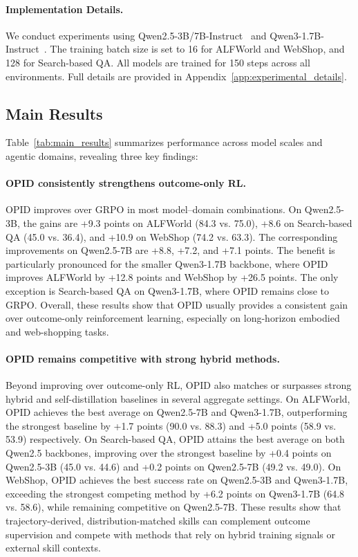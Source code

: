 \documentclass{llmxive}
\begin{document}
\paragraph{Implementation Details.}
We conduct experiments using Qwen2.5-3B/7B-Instruct~\citep{yang2024qwen25} and Qwen3-1.7B-Instruct~\citep{yang2025qwen3}. The training batch size is set to 16 for ALFWorld and WebShop, and 128 for Search-based QA. All models are trained for 150 steps across all environments. Full details are provided in Appendix~\ref{app:experimental_details}.


\subsection{Main Results}\label{subsec32_main_results}
Table~\ref{tab:main_results} summarizes performance across model scales and agentic domains, revealing three key findings:

\paragraph{OPID consistently strengthens outcome-only RL.}
OPID improves over GRPO in most model--domain combinations. On Qwen2.5-3B, the gains are +9.3 points on ALFWorld (84.3 vs. 75.0), +8.6 on Search-based QA (45.0 vs. 36.4), and +10.9 on WebShop (74.2 vs. 63.3). The corresponding improvements on Qwen2.5-7B are +8.8, +7.2, and +7.1 points. The benefit is particularly pronounced for the smaller Qwen3-1.7B backbone, where OPID improves ALFWorld by +12.8 points and WebShop by +26.5 points. The only exception is Search-based QA on Qwen3-1.7B, where OPID remains close to GRPO. Overall, these results show that OPID usually provides a consistent gain over outcome-only reinforcement learning, especially on long-horizon embodied and web-shopping tasks.

\paragraph{OPID remains competitive with strong hybrid methods.}
Beyond improving over outcome-only RL, OPID also matches or surpasses strong hybrid and self-distillation baselines in several aggregate settings. On ALFWorld, OPID achieves the best average on Qwen2.5-7B and Qwen3-1.7B, outperforming the strongest baseline by +1.7 points (90.0 vs. 88.3) and +5.0 points (58.9 vs. 53.9) respectively. On Search-based QA, OPID attains the best average on both Qwen2.5 backbones, improving over the strongest baseline by +0.4 points on Qwen2.5-3B (45.0 vs. 44.6) and +0.2 points on Qwen2.5-7B (49.2 vs. 49.0). On WebShop, OPID achieves the best success rate on Qwen2.5-3B and Qwen3-1.7B, exceeding the strongest competing method by +6.2 points on Qwen3-1.7B (64.8 vs. 58.6), while remaining competitive on Qwen2.5-7B. These results show that trajectory-derived, distribution-matched skills can complement outcome supervision and compete with methods that rely on hybrid training signals or external skill contexts.
\end{document}

